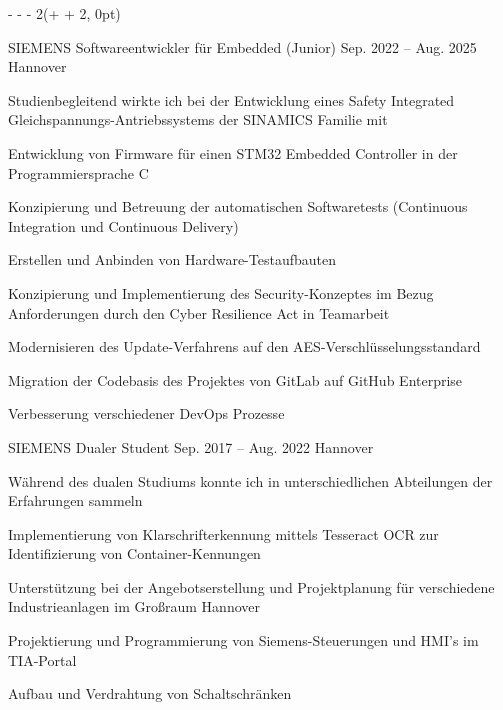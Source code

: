 \documentclass[12pt, a4paper]{awsome-cv-timeline}
\begin{document}
\begin{textblock*} %
	{\textwidth - \leftcolumnwidth - \leftcolumnrightmargin - 2\timelinemargin}(\leftcolumnwidth + \leftcolumnrightmargin + 2\timelinemargin, 0pt)

		\begin{cventries}
			\cventry%
				{SIEMENS} %
				{Softwareentwickler für Embedded (Junior)} %
				{Sep. 2022 -- Aug. 2025} %
				{Hannover} %
				{\vspace*{1.25ex}
					Studienbegleitend wirkte ich bei der Entwicklung eines Safety Integrated
					Gleichspannungs-Antriebssystems der SINAMICS Familie mit
					\begin{cvitems}
						\item Entwicklung von Firmware für einen STM32 Embedded Controller in der
							Programmiersprache C
						\item Konzipierung und Betreuung der automatischen Softwaretests
							(Continuous Integration und Continuous Delivery)
						\item Erstellen und Anbinden von Hardware-Testaufbauten
						\item Konzipierung und Implementierung des Security-Konzeptes im Bezug
							Anforderungen durch den Cyber Resilience Act in Teamarbeit
						\item Modernisieren des Update-Verfahrens auf den AES-Verschlüsselungsstandard
						\item Migration der Codebasis des Projektes von GitLab auf GitHub Enterprise
						\item Verbesserung verschiedener DevOps Prozesse
					\end{cvitems}
				}

			\cventry%
				{SIEMENS} %
				{Dualer Student} %
				{Sep. 2017 -- Aug. 2022} %
				{Hannover} %
				{\vspace*{1.25ex}
					Während des dualen Studiums konnte ich in unterschiedlichen Abteilungen der
					Erfahrungen sammeln
					\begin{cvitems}
						\item Implementierung von Klarschrifterkennung mittels Tesseract OCR
							zur Identifizierung von Container-Kennungen
						\item Unterstützung bei der Angebotserstellung und Projektplanung für
							verschiedene Industrieanlagen im Großraum Hannover
						\item Projektierung und Programmierung von Siemens-Steuerungen und HMI's
							im TIA-Portal
						\item Aufbau und Verdrahtung von Schaltschränken
					\end{cvitems}
				}


\end{cventries}
\end{textblock*}
\end{document}
